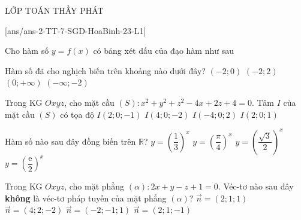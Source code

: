 \begin{name}
	{\tenchude}{\tendethi}{LỚP TOÁN THẦY PHÁT}{\thoigian}
\end{name}
\setcounter{ex}{0}\setcounter{bt}{0}
[ans/ans-2-TT-7-SGD-HoaBinh-23-L1]

\begin{ex}%
	Cho hàm số $y=f(x)$ có bảng xét dấu của đạo hàm như sau
	\begin{center}
	\end{center}
Hàm số đã cho nghịch biến trên khoảng nào dưới đây?
	\choice
	{\True $(-2;0)$}
	{$(-2;2)$}
	{$(0;+\infty)$}
	{$(-\infty;-2)$}

\end{ex}
\begin{ex}%
Trong KG $Oxyz$, cho mặt cầu $(S) \colon x^2+y^2+z^2-4x+2z+4=0$. Tâm $I$ của mặt cầu $(S)$ có tọa độ
	\choice
{\True $I(2;0;-1)$}
{ $I(4;0;-2)$}
{$I(-4;0;2)$ }
{$I(2;0;1)$}
\end{ex}
\begin{ex}%
	Hàm số nào sau đây đồng biến trên $\mathbb{R}$?
	\choice
	{$y=\left(\dfrac{1}{3}\right)^x$}
	{$y=\left(\dfrac{\pi}{4}\right)^x$}
	{$y=\left(\dfrac{\sqrt{3}}{2}\right)^x$}
	{\True $y=\left(\dfrac{\mathrm{e}}{2}\right)^x$}
\end{ex}
\begin{ex}%
	Trong KG $Oxyz$, cho mặt phẳng $(\alpha)\colon 2x+y-z+1=0$. Véc-tơ nào sau đây \textbf{không} là véc-tơ pháp tuyến của mặt phẳng $(\alpha)$?
	\choice
	{\True $\overrightarrow{n}=(2;1;1)$}
	{$\overrightarrow{n}=(4;2;-2)$}
	{$\overrightarrow{n}=(-2;-1;1)$}
	{$\overrightarrow{n}=(2;1;-1)$}
\end{ex}
